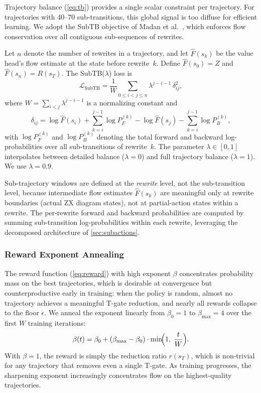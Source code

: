 \documentclass[11pt,a4paper]{article}
\begin{document}
Trajectory balance (\cref{eq:tb}) provides a single scalar constraint per
trajectory.  For trajectories with 40--70 sub-transitions, this global
signal is too diffuse for efficient learning.  We adopt the SubTB
objective of Madan et al.~\cite{madan2023subtb}, which enforces flow
conservation over all contiguous sub-sequences of rewrites.

Let $n$ denote the number of rewrites in a trajectory, and let
$\hat{F}(s_k)$ be the value head's flow estimate at the state before
rewrite~$k$.  Define $\hat{F}(s_0) = Z$ and
$\hat{F}(s_n) = R(s_T)$.  The SubTB($\lambda$) loss is
\begin{equation}\label{eq:subtb}
\mathcal{L}_{\mathrm{SubTB}} = \frac{1}{W}
\sum_{0 \le i < j \le n}
\lambda^{j-i-1}\,\delta_{ij}^2,
\end{equation}
where $W = \sum_{i<j} \lambda^{j-i-1}$ is a normalizing constant and
\begin{equation}\label{eq:subtb_delta}
\delta_{ij} = \log \hat{F}(s_i)
  + \sum_{k=i}^{j-1} \log P_F^{(k)}
  - \log \hat{F}(s_j)
  - \sum_{k=i}^{j-1} \log P_B^{(k)},
\end{equation}
with $\log P_F^{(k)}$ and $\log P_B^{(k)}$ denoting the total forward
and backward log-probabilities over all sub-transitions of rewrite~$k$.
The parameter $\lambda \in [0,1]$ interpolates between detailed balance
($\lambda{=}0$) and full trajectory balance ($\lambda{=}1$).  We use
$\lambda{=}0.9$.

Sub-trajectory windows are defined at the \emph{rewrite} level, not the
sub-transition level, because intermediate flow estimates $\hat{F}(s_k)$
are meaningful only at rewrite boundaries (actual ZX diagram states), not
at partial-action states within a rewrite.  The per-rewrite forward and
backward probabilities are computed by summing sub-transition
log-probabilities within each rewrite, leveraging the decomposed
architecture of \cref{sec:subactions}.

\subsubsection{Reward Exponent Annealing}\label{sec:annealing}

The reward function (\cref{eq:reward}) with high exponent $\beta$
concentrates probability mass on the best trajectories, which is
desirable at convergence but counterproductive early in training: when the
policy is random, almost no trajectory achieves a meaningful T-gate
reduction, and nearly all rewards collapse to the floor $\epsilon$.  We
anneal the exponent linearly from $\beta_0 = 1$ to $\beta_{\max} = 4$
over the first $W$ training iterations:
\begin{equation}\label{eq:anneal}
\beta(t) = \beta_0 + (\beta_{\max} - \beta_0)
    \cdot \min\!\Bigl(1,\; \frac{t}{W}\Bigr).
\end{equation}
With $\beta{=}1$, the reward is simply the reduction ratio $r(s_T)$,
which is non-trivial for any trajectory that removes even a single
T-gate.  As training progresses, the sharpening exponent increasingly
concentrates flow on the highest-quality trajectories.
\end{document}
